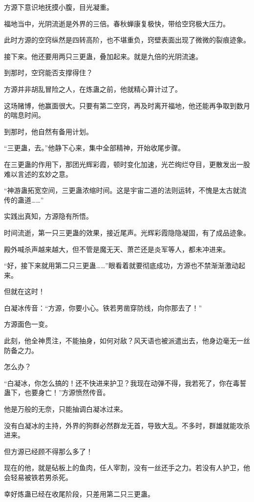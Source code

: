 \begin{this_body}
方源下意识地抚摸小腹，目光凝重。

福地当中，光阴流逝是外界的三倍。春秋蝉康复极快，带给空窍极大压力。

此时方源的空窍纵然是四转高阶，也不堪重负，窍壁表面出现了微微的裂痕迹象。

接下来。他还要用两只三更蛊，叠加起来。就是九倍的光阴流速。

到那时，空窍能否支撑得住？

方源并非胡乱冒险之人，在炼蛊之前，他就精心算计过了。

这场赌博，他赢面很大。只要有第二空窍，再及时离开福地，他还能再争取到数月的喘息时间。

到那时，他自然有备用计划。

“三更蛊，去。”他静下心来，集中全部精神，开始收尾步骤。

在三更蛊的作用下，那团光辉彩霞，顿时变化加速，光芒绚烂夺目，更散发出一股难以言述的玄妙之意。

“神游蛊拓宽空间，三更蛊浓缩时间。这是宇宙二道的法则运转，不愧是太古就流传的蛊道……”

实践出真知，方源隐有所悟。

时间流逝，第一只三更蛊的效果，接近尾声。光辉彩霞隐隐凝固，有了成品迹象。

殿外喊杀声越来越大，但不管是魔无天、萧芒还是炎军等人，都未冲进来。

“好，接下来就用第二只三更蛊……”眼看着就要彻底成功，方源也不禁渐渐激动起来。

但就在这时！

白凝冰传音：“方源，你要小心。铁若男凿穿防线，向你那去了！”

方源面色一变。

此刻，他全神贯注，不能抽身，如何对敌？风天语也被派遣出去，他身边毫无一丝防备之力。

怎么办？

“白凝冰，你怎么搞的！还不快进来护卫？我现在动弹不得，我若死了，你在毒誓蛊下，也要身亡！”方源愤然传音。

他是万般的无奈，只能抽调白凝冰过来。

没有白凝冰的主持，外界的狗群必然群龙无首，导致大乱。不多时，群雄就能攻杀进来。

但方源已经顾不得那么多了！

现在的他，就是砧板上的鱼肉，任人宰割，没有一丝还手之力。若没有人护卫，他会轻易被铁若男杀死。

幸好炼蛊已经在收尾阶段，只差用第二只三更蛊。


\end{this_body}
